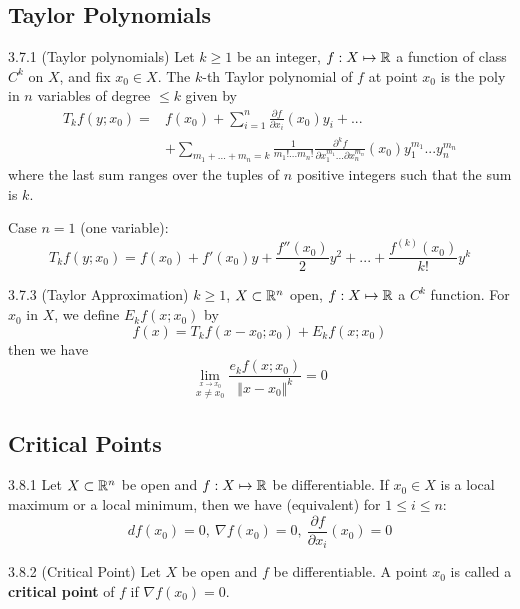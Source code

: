 \subsection{Taylor Polynomials}
\begin{definition}{3.7.1 (Taylor polynomials)}
    Let $k \ge 1$ be an integer, $f: X \mapsto \mathbb{R}$ a function of class $C^k$ on $X$, and fix $x_0 \in X$. The
    $k$-th Taylor polynomial of $f$ at point $x_0$ is the poly in $n$ variables of degree $\le k$ given by
    \begin{align*}
        T_k f(y;x_0) = & f(x_0) + \sum_{i=1}^n \frac{\partial f}{\partial x_i}(x_0)y_i + ...                                                                          \\
                       & + \sum_{m_1 + ... + m_n = k} \frac{1}{m_1!...m_n!} \frac{\partial^k f}{\partial x_1^{m_1} ... \partial x_n^{m_n}} (x_0)y_1^{m_1}...y_n^{m_n}
    \end{align*}
    where the last sum ranges over the tuples of $n$ positive integers such that the sum is $k$.

    Case $n=1$ (one variable):
    \[ T_k f(y; x_0) = f(x_0) + f'(x_0)y + \frac{f''(x_0)}{2}y^2 + ... + \frac{f^{(k)}(x_0)}{k!}y^k \]
\end{definition}

\begin{proposition}{3.7.3 (Taylor Approximation)}
    $k \ge 1$, $X \subset \mathbb{R}^n$ open, $f: X \mapsto \mathbb{R}$ a $C^k$ function. For $x_0$ in $X$, we define $E_k f(x;x_0)$ by
    \[ f(x) = T_k f(x - x_0;x_0) + E_k f(x;x_0) \]
    then we have
    \[ \lim_{\stackrel{x \to x_0}{x \ne x_0}} \frac{e_k f(x;x_0)}{\Vert x - x_0 \Vert^k} = 0 \]
\end{proposition}


\subsection{Critical Points}
\begin{proposition}{3.8.1}
    Let $X \subset \mathbb{R}^n$ be open and $f: X \mapsto \mathbb{R}$ be differentiable.
    If $x_0 \in X$ is a local maximum or a local minimum, then we have (equivalent) for $1 \le i \le n$:
    \[ df(x_0) = 0,\ \nabla f(x_0) = 0,\ \frac{\partial f}{\partial x_i}(x_0) = 0 \]
\end{proposition}

\begin{definition}{3.8.2 (Critical Point)}
    Let $X$ be open and $f$ be differentiable.
    A point $x_0$ is called a \textbf{critical point} of $f$ if $\nabla f(x_0) = 0$.
\end{definition}

